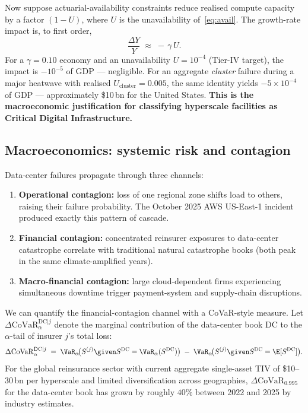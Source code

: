 Now suppose actuarial-availability constraints reduce realised compute
capacity by a factor $(1-U)$, where $U$ is the unavailability
of~\eqref{eq:avail}. The growth-rate impact is, to first order,
\begin{equation}\label{eq:gdp-impact}
   \frac{\Delta Y}{Y} \;\approx\; -\,\gamma\, U.
\end{equation}
For a $\gamma=0.10$ economy and an unavailability $U=10^{-4}$
(Tier-IV target), the impact is $-10^{-5}$ of GDP --- negligible. For
an aggregate \emph{cluster} failure during a major heatwave with
realised $U_{\mathrm{cluster}}=0.005$, the same identity yields
$-5\times 10^{-4}$ of GDP --- approximately \$10\,bn for the United
States. \textbf{This is the macroeconomic justification for
classifying hyperscale facilities as Critical Digital
Infrastructure.}

\subsection{Macroeconomics: systemic risk and contagion}\label{ss:systemic}

Data-center failures propagate through three channels:
\begin{enumerate}[leftmargin=*,nosep]
   \item \textbf{Operational contagion:} loss of one regional zone
         shifts load to others, raising their failure probability.
         The October 2025 AWS US-East-1 incident produced exactly this
         pattern of cascade.
   \item \textbf{Financial contagion:} concentrated reinsurer exposures
         to data-center catastrophe correlate with traditional natural
         catastrophe books (both peak in the same climate-amplified
         years).
   \item \textbf{Macro-financial contagion:} large cloud-dependent
         firms experiencing simultaneous downtime trigger payment-system
         and supply-chain disruptions.
\end{enumerate}
We can quantify the financial-contagion channel with a CoVaR-style
measure. Let $\Delta\mathrm{CoVaR}^{\mathrm{DC}|j}_{\alpha}$ denote
the marginal contribution of the data-center book $\mathrm{DC}$ to the
$\alpha$-tail of insurer $j$'s total loss:
\begin{equation}\label{eq:covar}
   \Delta\mathrm{CoVaR}^{\mathrm{DC}|j}_{\alpha}
   \;=\; \VaR_{\alpha}\!\bigl(S^{(j)}\given S^{\mathrm{DC}}=\VaR_{\alpha}(S^{\mathrm{DC}})\bigr)
       \;-\; \VaR_{\alpha}\!\bigl(S^{(j)}\given S^{\mathrm{DC}}=\E[S^{\mathrm{DC}}]\bigr).
\end{equation}
For the global reinsurance sector with current aggregate single-asset
TIV of \$10--30\,bn per hyperscale and limited diversification across
geographies, $\Delta\mathrm{CoVaR}_{0.995}$ for the data-center book
has grown by roughly $40\%$ between 2022 and 2025 by industry
estimates.

